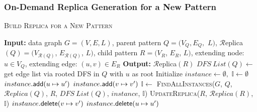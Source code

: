 \subsubsection{On-Demand Replica Generation for a New Pattern}
\label{sec:rep_generate}
%
\begin{algorithm} [tb!]
 \caption{\textsc{Build Replica for a New Pattern}}
 \label{algo:getreplica}
{\scriptsize
 \dontprintsemicolon
 \nonl \textbf{Input:} data graph $G=(V,E,L)$, parent
 pattern $Q=(V_Q,E_Q,$ $L)$, $\mathcal{R}$eplica$(Q)=(V_{\mathcal{R}(Q)}$,
 $E_{\mathcal{R}(Q)}$, $L)$, child pattern $R=(V_R$, $E_R$, $L)$, extending node:
 $u\in V_Q$, extending edge: $(u,v) \in E_R$ \;
\nonl \textbf{Output:} $\mathcal{R}$eplica$(R)$ \;
	\vspace{0.3mm}
	$DFS\ List(Q)\leftarrow$ get edge list via rooted DFS in $Q$ with $u$ as root \;
	Initialize $instance \leftarrow \emptyset, $ $ \mathbb{I} \leftarrow \emptyset$\;
	{
		$instance.{\sf add}(u\mapsto u')$\;
		{
			$instance.{\sf add}(v\mapsto v')$\;
	        $\mathbb{I}\leftarrow$ \textsc{FindAllInstances($G$, $Q$, $\mathcal{R}eplica(Q)$, $R$,
	        $DFS\ List(Q)$, $instance$, $\mathbb{I}$)}\;
			\textsc{UpdateReplica($R$, $\mathcal{R}eplica(R)$, $\mathbb{I}$)}\;
			$instance.{\sf delete}(v\mapsto v')$\;
		}
		$instance.{\sf delete}(u\mapsto u')$\;
	}	
	\;}
\end{algorithm}
%
\vspace{-2mm}
